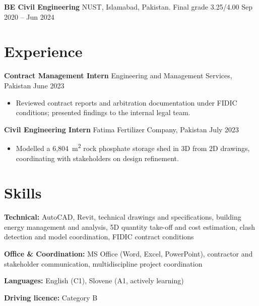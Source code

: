 \documentclass[a4paper,10.5pt]{article}
\newcommand{\datefill}{\dotfill}
\newcommand{\entry}[3]{\vspace{2.5pt}\noindent\textbf{#1} \textbar{} #2 \datefill{} #3\par\vspace{0.5pt}}
\newcommand{\skillrow}[2]{\noindent\textbf{#1:} #2\par\vspace{1pt}}
\begin{document}
\entry{BE Civil Engineering}{NUST, Islamabad, Pakistan. Final grade 3.25/4.00}{Sep 2020 -- Jun 2024}

\section{Experience}
\entry{Contract Management Intern}{Engineering and Management Services, Pakistan}{June 2023}
\begin{itemize}
  \item Reviewed contract reports and arbitration documentation under FIDIC
        conditions; presented findings to the internal legal team.
\end{itemize}

\entry{Civil Engineering Intern}{Fatima Fertilizer Company, Pakistan}{July 2023}
\begin{itemize}
  \item Modelled a 6,804~m\textsuperscript{2} rock phosphate storage shed in 3D from
        2D drawings, coordinating with stakeholders on design refinement.
\end{itemize}

\section{Skills}

\skillrow{Technical}{AutoCAD, Revit, technical drawings and specifications, building energy management and analysis, 5D quantity take-off and cost estimation, clash detection and model coordination, FIDIC contract conditions}
\skillrow{Office \& Coordination}{MS Office (Word, Excel, PowerPoint), contractor and stakeholder communication, multidiscipline project coordination}

\skillrow{Languages}{English (C1), Slovene (A1, actively learning)}
\skillrow{Driving licence}{Category B}
\end{document}
